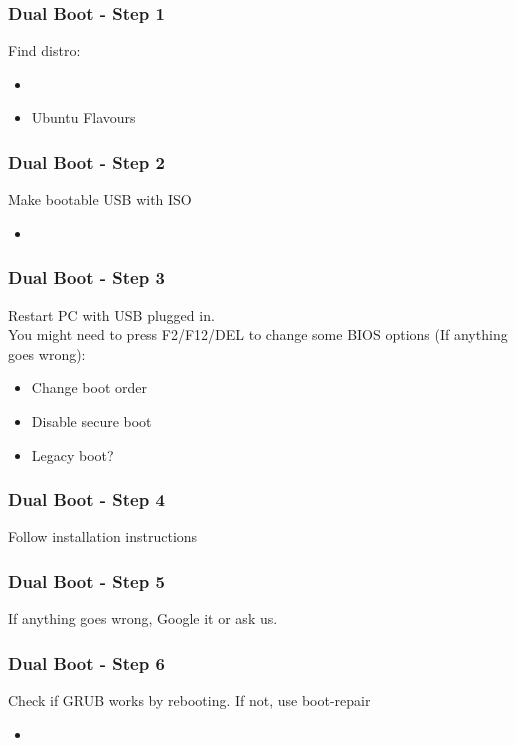 \begin{frame}
	\frametitle{Dual Boot - Step 1}
 
 	Find distro:
    \begin{itemize}
    	\item {}
		\item {} {Ubuntu Flavours}
	\end{itemize}
    
\end{frame}

\begin{frame}
	\frametitle{Dual Boot - Step 2}
    
    Make bootable USB with ISO
    \begin{itemize}
    	\item {}
    \end{itemize}
    
\end{frame}

\begin{frame}
	\frametitle{Dual Boot - Step 3}
    
    Restart PC with USB plugged in.\\
    
    You might need to press F2/F12/DEL to change some BIOS options (If anything goes wrong):
 	\begin{itemize}
		\item Change boot order
		\item Disable secure boot
		\item Legacy boot?
	\end{itemize}
\end{frame}

\begin{frame}
	\frametitle{Dual Boot - Step 4}
    
    Follow installation instructions
    
\end{frame}

\begin{frame}
	\frametitle{Dual Boot - Step 5}
    
    If anything goes wrong, Google it or ask us.
    
\end{frame}

\begin{frame}
	\frametitle{Dual Boot - Step 6}
    
    Check if GRUB works by rebooting. If not, use boot-repair
    \begin{itemize}
    	\item {}
    \end{itemize}
    
\end{frame}

